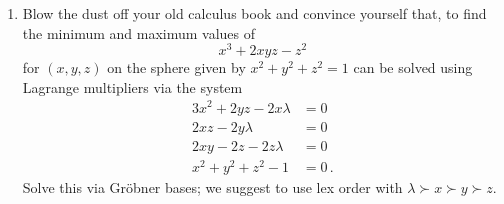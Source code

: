 \documentclass[11pt]{article}
\begin{document}
\begin{enumerate}[(1)]
\item Blow the dust off your old calculus book and convince yourself that, to find the minimum and maximum values of
\[
  x^3 + 2xyz - z^2
\]
for $(x,y,z)$ on the sphere given by $x^2 + y^2 + z^2 = 1$ can be solved using Lagrange multipliers via the system
\begin{align*}
  3x^2 + 2yz - 2x \lambda &= 0 \\
  2xz - 2y \lambda &= 0 \\
  2xy - 2z - 2z \lambda &= 0 \\
  x^2 + y^2 + z^2 - 1 &= 0 \, .
\end{align*}
Solve this via Gr\"obner bases; we suggest to use lex order with $\lambda \succ x \succ y \succ z$.

\end{enumerate}
\end{document}
